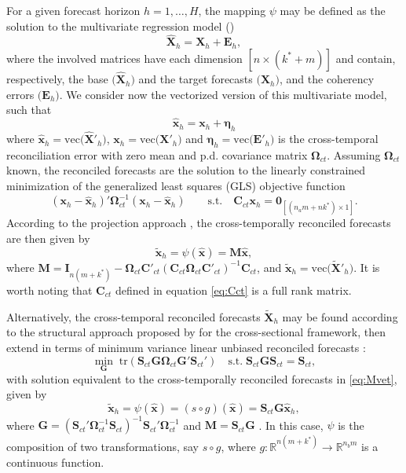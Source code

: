 \documentclass[a4paper,11pt]{article}
\newcommand{\etavet}{\bm{\eta}}
\newcommand{\xvet}{\bm{x}}
\newcommand{\Cvet}{\bm{C}}
\newcommand{\Evet}{\bm{E}}
\newcommand{\Gvet}{\bm{G}}
\newcommand{\Ivet}{\bm{I}}
\newcommand{\Mvet}{\bm{M}}
\newcommand{\Svet}{\bm{S}}
\newcommand{\Xvet}{\bm{X}}
\newcommand{\Zerovet}{\bm{0}}
\newcommand{\Omegavet}{\bm{\Omega}}
\theoremstyle{definition}
\begin{document}
For a given forecast horizon $h = 1,\dots, H$, the mapping $\psi$ may be defined as the solution to the multivariate regression model (\citealp{difonzo2023})
$$
	\widehat{\Xvet}_{h} = \Xvet_{h} + \Evet_{h},
$$
where the involved matrices have each dimension $[n \times (k^\ast + m)]$ and contain, respectively, the base $\Big(\widehat{\Xvet}_{h}\Big)$ and the target forecasts $\Big(\Xvet_{h}\Big)$, and the coherency errors $\Big(\Evet_{h}\Big)$. We consider now the vectorized version of this multivariate model, such that
$$
	\widehat{\xvet}_{h} = \xvet_{h} + \etavet_{h}
$$
where $\widehat{\xvet}_{h} = \mathrm{vec}\Big(\widehat{\Xvet}'_{h}\Big)$, $\xvet_{h} = \mathrm{vec}\Big(\Xvet'_{h}\Big)$ and $\etavet_{h} = \mathrm{vec}\Big(\Evet'_{h}\Big)$  is the cross-temporal reconciliation error with zero mean and p.d. covariance matrix $\Omegavet_{ct}$.
Assuming $\Omegavet_{ct}$ known, the reconciled forecasts are the solution to the linearly constrained minimization of the generalized least squares (GLS) objective function
$$
	\left(\xvet_h - \widehat{\xvet}_h\right)' \Omegavet_{ct}^{-1}\left(\xvet_h - \widehat{\xvet}_h\right)  \qquad \text{s.t.} \quad \Cvet_{ct}\xvet_h = \Zerovet_{[(n_am+nk^\ast)\times1]}.
$$
According to the projection approach \citep{byron1978,byron1979, vanerven2015, wickramasuriya2019, panagiotelis2021, difonzo2023}, the cross-temporally reconciled forecasts are then given by
\begin{equation}
	\label{eq:Mvet}
	\widetilde{\xvet}_{h} = \psi\left(\widehat{\xvet}\right) = \Mvet \widehat{\xvet},
\end{equation}
where $\Mvet = \Ivet_{n(m+ k^\ast)} - \Omegavet_{ct}\Cvet'_{ct}\left(\Cvet_{ct}\Omegavet_{ct}\Cvet'_{ct}\right)^{-1}\Cvet_{ct}$, and $\widetilde{\xvet}_{h} = \mathrm{vec}\Big(\widetilde{\Xvet}'_{h}\Big)$. It is worth noting that $\Cvet_{ct}$ defined in equation \eqref{eq:Cct} is a full rank matrix.

Alternatively, the cross-temporal reconciled forecasts $\widetilde{\Xvet}_{h}$ may be found according to the structural approach proposed by \cite{hyndman2011} for the cross-sectional framework, then extend in terms of minimum variance linear unbiased reconciled forecasts \citep{wickramasuriya2019}:
$$
	\min_{\Gvet} \; \text{tr}\left(\Svet_{ct}\Gvet\Omegavet_{ct}\Gvet'\Svet_{ct}' \right) \quad \text{s.t.} \; \Svet_{ct}\Gvet\Svet_{ct} = \Svet_{ct},
$$
with solution equivalent to the cross-temporally reconciled forecasts in \eqref{eq:Mvet}, given by
\begin{equation}\label{eq:SGy}
	\widetilde{\xvet}_{h} = \psi\left(\widehat{\xvet}\right) = \left(s \circ g \right)\left(\widehat{\xvet}\right)=\Svet_{ct}\Gvet \widehat{\xvet}_{h},
\end{equation}
where $\Gvet = \left(\Svet_{ct}' \Omegavet_{ct}^{-1}\Svet_{ct}\right)^{-1} \Svet_{ct}'\Omegavet_{ct}^{-1}$ and $\Mvet = \Svet_{ct} \Gvet$ \citep{wickramasuriya2019, difonzo2023}. In this case, $\psi$ is the composition of two transformations, say $s \circ g$, where $g: \mathbb{R}^{n(m+k^\ast)} \rightarrow \mathbb{R}^{n_b m}$ is a continuous function.
\end{document}
